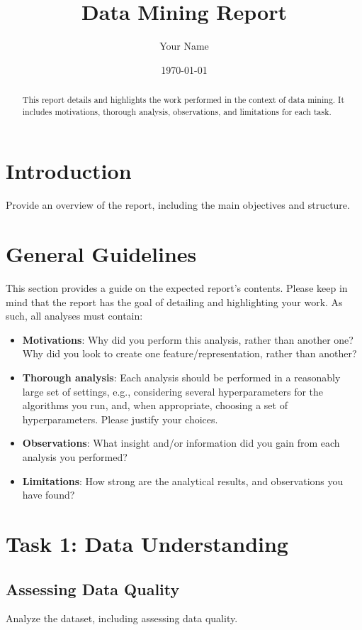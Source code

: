 \documentclass[a4paper,12pt]{article}
\title{Data Mining Report}
\author{Your Name}
\date{\today}
\begin{document}
\maketitle

\begin{abstract}
This report details and highlights the work performed in the context of data mining. It includes motivations, thorough analysis, observations, and limitations for each task.
\end{abstract}

\section{Introduction}
\label{sec:introduction}
Provide an overview of the report, including the main objectives and structure.

\section{General Guidelines}
\label{sec:guidelines}
This section provides a guide on the expected report's contents. Please keep in mind that the report has the goal of detailing and highlighting your work. As such, all analyses must contain:
\begin{itemize}
    \item \textbf{Motivations}: Why did you perform this analysis, rather than another one? Why did you look to create one feature/representation, rather than another?
    \item \textbf{Thorough analysis}: Each analysis should be performed in a reasonably large set of settings, e.g., considering several hyperparameters for the algorithms you run, and, when appropriate, choosing a set of hyperparameters. Please justify your choices.
    \item \textbf{Observations}: What insight and/or information did you gain from each analysis you performed?
    \item \textbf{Limitations}: How strong are the analytical results, and observations you have found?
\end{itemize}

\section{Task 1: Data Understanding}
\label{sec:task1}
\subsection{Assessing Data Quality}
Analyze the dataset, including assessing data quality.
\end{document}
